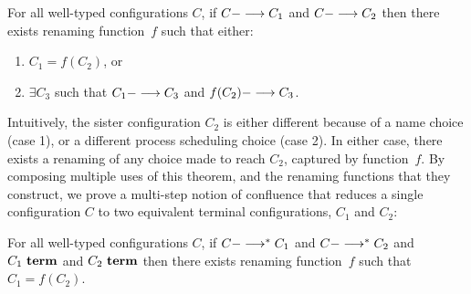 \begin{theorem}
For all well-typed configurations $C$,
%
 if $C ---> C_1$ 
and $C ---> C_2$ 
then 
there exists renaming function~$f$ 
such that either:
\begin{enumerate}
\item %
$C_1 = f(C_2)$,
or
\item $\exists C_3$ such that $C_1 ---> C_3$ and $f(C_2) ---> C_3$.
\end{enumerate}
\end{theorem}

Intuitively, the sister configuration $C_2$ is either different
because of a name choice (case 1), or a different process scheduling choice
(case 2).  In either case, there exists a renaming of any choice made
to reach $C_2$, captured by function~$f$.
%
By composing multiple uses of this theorem, and the renaming functions
that they construct, we prove a multi-step notion of confluence that 
reduces a single configuration $C$ to two equivalent terminal configurations,
 $C_1$ and $C_2$:

\begin{theorem}
For all well-typed configurations $C$,
%
 if $C --->^\ast C_1$ 
and $C --->^\ast C_2$ 
and $C_1~\textbf{term}$
and $C_2~\textbf{term}$
then 
there exists renaming function~$f$ 
such that $C_1 = f(C_2)$.
\end{theorem}
